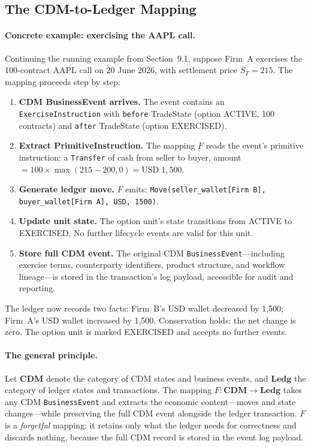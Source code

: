 \documentclass[11pt,a4paper]{article}
\begin{document}
\subsection{The CDM-to-Ledger Mapping}

\paragraph{Concrete example: exercising the AAPL call.}
Continuing the running example from Section~9.1, suppose Firm~A exercises the 100-contract AAPL call on 20 June 2026, with settlement price $S_T = 215$. The mapping proceeds step by step:

\begin{enumerate}[nosep]
\item \textbf{CDM BusinessEvent arrives.} The event contains an \texttt{ExerciseInstruction} with \texttt{before} TradeState (option ACTIVE, 100 contracts) and \texttt{after} TradeState (option EXERCISED).
\item \textbf{Extract PrimitiveInstruction.} The mapping $F$ reads the event's primitive instruction: a \texttt{Transfer} of cash from seller to buyer, amount $= 100 \times \max(215 - 200, 0) = \text{USD}\;1{,}500$.
\item \textbf{Generate ledger move.} $F$ emits: \texttt{Move(seller\_wallet[Firm~B], buyer\_wallet[Firm~A], USD, 1500)}.
\item \textbf{Update unit state.} The option unit's state transitions from ACTIVE to EXERCISED. No further lifecycle events are valid for this unit.
\item \textbf{Store full CDM event.} The original CDM \texttt{BusinessEvent}---including exercise terms, counterparty identifiers, product structure, and workflow lineage---is stored in the transaction's log payload, accessible for audit and reporting.
\end{enumerate}

The ledger now records two facts: Firm~B's USD wallet decreased by 1{,}500; Firm~A's USD wallet increased by 1{,}500. Conservation holds: the net change is zero. The option unit is marked EXERCISED and accepts no further events.

\paragraph{The general principle.}
Let $\mathbf{CDM}$ denote the category of CDM states and business events, and $\mathbf{Ledg}$ the category of ledger states and transactions. The mapping $F : \mathbf{CDM} \to \mathbf{Ledg}$ takes any CDM \texttt{BusinessEvent} and extracts the economic content---moves and state changes---while preserving the full CDM event alongside the ledger transaction. $F$ is a \textit{forgetful} mapping: it retains only what the ledger needs for correctness and discards nothing, because the full CDM record is stored in the event log payload.
\end{document}
